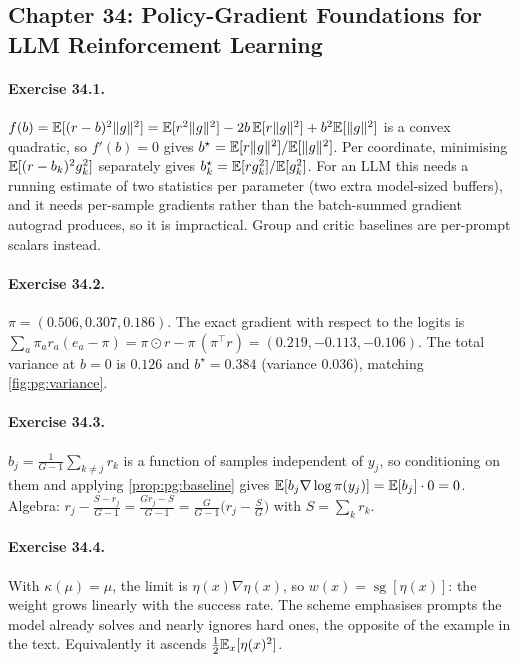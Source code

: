 \subsection*{Chapter 34: Policy-Gradient Foundations for LLM Reinforcement Learning}

\paragraph{Exercise 34.1.} $f(b)=\mathbb{E}[(r-b)^2\|g\|^2]=\mathbb{E}[r^2\|g\|^2]-2b\,\mathbb{E}[r\|g\|^2]+b^2\mathbb{E}[\|g\|^2]$
is a convex quadratic, so $f'(b)=0$ gives $b^\star=\mathbb{E}[r\|g\|^2]/\mathbb{E}[\|g\|^2]$. Per coordinate,
minimising $\mathbb{E}[(r-b_k)^2g_k^2]$ separately gives $b_k^\star=\mathbb{E}[r g_k^2]/\mathbb{E}[g_k^2]$. For an LLM this
needs a running estimate of two statistics per parameter (two extra model-sized buffers), and
it needs per-sample gradients rather than the batch-summed gradient autograd produces, so it
is impractical. Group and critic baselines are per-prompt scalars instead.

\paragraph{Exercise 34.2.} $\pi=(0.506,0.307,0.186)$. The exact gradient with respect to the
logits is $\sum_a\pi_a r_a(e_a-\pi)=\pi\odot r-\pi\,(\pi^\top r)=(0.219,-0.113,-0.106)$. The
total variance at $b=0$ is $0.126$ and $b^\star=0.384$ (variance $0.036$), matching
\cref{fig:pg:variance}.

\paragraph{Exercise 34.3.} $b_j=\frac{1}{G-1}\sum_{k\ne j}r_k$ is a function of samples
independent of $y_j$, so conditioning on them and applying \cref{prop:pg:baseline} gives
$\mathbb{E}[b_j\nabla\log\pi(y_j)]=\mathbb{E}[b_j]\cdot0=0$. Algebra:
$r_j-\frac{S-r_j}{G-1}=\frac{Gr_j-S}{G-1}=\frac{G}{G-1}\big(r_j-\frac{S}{G}\big)$ with $S=\sum_k r_k$.

\paragraph{Exercise 34.4.} With $\kappa(\mu)=\mu$, the limit is $\eta(x)\nabla\eta(x)$, so
$w(x)=\operatorname{sg}[\eta(x)]$: the weight grows linearly with the success rate. The scheme
emphasises prompts the model already solves and nearly ignores hard ones, the opposite of the
example in the text. Equivalently it ascends $\tfrac12\mathbb{E}_x[\eta(x)^2]$.

